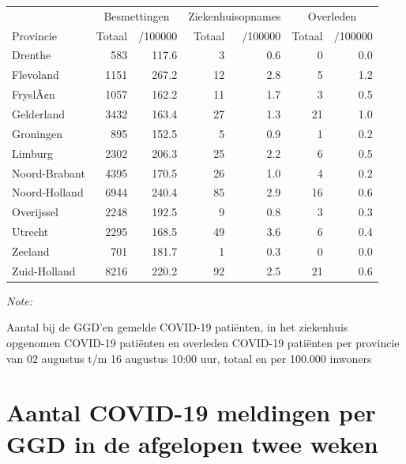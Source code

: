 \documentclass[
  english,
  man,floatsintext]{apa6}
\begin{document}
\begin{table}
\centering
\begin{threeparttable}
\begin{tabular}{lrrrrrr}
\toprule
\multicolumn{1}{c}{ } & \multicolumn{2}{c}{Besmettingen} & \multicolumn{2}{c}{Ziekenhuisopnames} & \multicolumn{2}{c}{Overleden} \\
\cmidrule(l{3pt}r{3pt}){2-3} \cmidrule(l{3pt}r{3pt}){4-5} \cmidrule(l{3pt}r{3pt}){6-7}
Provincie & Totaal & /100000 & Totaal & /100000 & Totaal & /100000\\
\midrule
Drenthe & 583 & 117.6 & 3 & 0.6 & 0 & 0.0\\
Flevoland & 1151 & 267.2 & 12 & 2.8 & 5 & 1.2\\
FryslÃ¢n & 1057 & 162.2 & 11 & 1.7 & 3 & 0.5\\
Gelderland & 3432 & 163.4 & 27 & 1.3 & 21 & 1.0\\
Groningen & 895 & 152.5 & 5 & 0.9 & 1 & 0.2\\
Limburg & 2302 & 206.3 & 25 & 2.2 & 6 & 0.5\\
Noord-Brabant & 4395 & 170.5 & 26 & 1.0 & 4 & 0.2\\
Noord-Holland & 6944 & 240.4 & 85 & 2.9 & 16 & 0.6\\
Overijssel & 2248 & 192.5 & 9 & 0.8 & 3 & 0.3\\
Utrecht & 2295 & 168.5 & 49 & 3.6 & 6 & 0.4\\
Zeeland & 701 & 181.7 & 1 & 0.3 & 0 & 0.0\\
Zuid-Holland & 8216 & 220.2 & 92 & 2.5 & 21 & 0.6\\
\bottomrule
\end{tabular}
\begin{tablenotes}
\item \textit{Note: } 
\item Aantal bij de GGD’en gemelde COVID-19 patiënten, in het ziekenhuis opgenomen COVID-19 patiënten en overleden COVID-19 patiënten per provincie van 02 augustus t/m 16 augustus 10:00 uur, totaal en per 100.000 inwoners
\end{tablenotes}
\end{threeparttable}
\end{table}

\newpage

\hypertarget{aantal-covid-19-meldingen-per-ggd-in-de-afgelopen-twee-weken}{%
\section{Aantal COVID-19 meldingen per GGD in de afgelopen twee weken}\label{aantal-covid-19-meldingen-per-ggd-in-de-afgelopen-twee-weken}}
\end{document}
